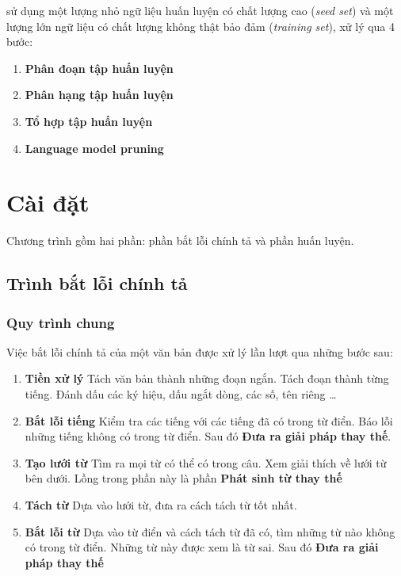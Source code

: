 \documentclass[a4paper,oneside]{book} %
\begin{document}
\cite{text-tiling} sử dụng một lượng nhỏ ngữ liệu huấn luyện có chất
lượng cao (\textit{seed set}) và một lượng lớn ngữ liệu có chất lượng
không thật bảo đảm (\textit{training set}), xử lý qua 4 bước:
\begin{enumerate}
\item \textbf{Phân đoạn tập huấn luyện}
\item \textbf{Phân hạng tập huấn luyện}
\item \textbf{Tổ hợp tập huấn luyện}
\item \textbf{Language model pruning}
\end{enumerate}

\chapter{Cài đặt}
\label{cha:implementation}

Chương trình gồm hai phần: phần bắt lỗi chính tả và phần huấn luyện.

\section{Trình bắt lỗi chính tả}


\subsection{Quy trình chung}
\label{sec:spellcheck}

Việc bắt lỗi chính tả của một văn bản được xử lý lần lượt qua những
bước sau:
\begin{enumerate}
\item \textbf{Tiền xử lý} Tách văn bản thành những đoạn ngắn. Tách
  đoạn thành từng tiếng. Đánh dấu các ký hiệu, dấu ngắt dòng, các số,
  tên riêng \ldots
\item \textbf{Bắt lỗi tiếng} Kiểm tra các tiếng với các tiếng đã có
  trong từ điển. Báo lỗi những tiếng không có trong từ điển. Sau đó 
  \textbf{Đưa ra giải pháp thay thế}.
\item \textbf{Tạo lưới từ} Tìm ra mọi từ có thể có trong câu. Xem
  giải thích về lưới từ bên dưới. Lồng trong phần này là phần
  \textbf{Phát sinh từ thay thế}
\item \textbf{Tách từ} Dựa vào lưới từ, đưa ra cách tách từ tốt nhất.
\item \textbf{Bắt lỗi từ} Dựa vào từ điển và cách tách từ đã có,
  tìm những từ nào không có trong từ điển. Những từ này được xem là từ
  sai. Sau đó \textbf{Đưa ra giải pháp thay thế}
\end{enumerate}
\end{document}
